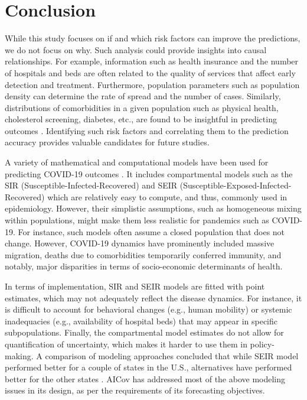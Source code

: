 \documentclass[a4paper, inpress]{jds} %
\renewcommand{\_}{%
    \textunderscore\hspace{0pt}%
}
\begin{document}

\section{Conclusion}

While this study focuses on if and which risk factors can improve the
predictions, we do not focus on why. Such analysis could provide
insights into causal relationships. For example, information such as
health insurance and the number of hospitals and beds are often
related to the quality of services that affect early detection and
treatment. Furthermore, population parameters such as population density can
determine the rate of spread and the number of cases. Similarly,
distributions of comorbidities in a given population such as physical
health, cholesterol screening, diabetes, etc., are found to be
insightful in predicting outcomes \citep{Maleki}. Identifying such risk
factors and correlating them to the prediction accuracy provides
valuable candidates for future studies.

A variety of mathematical and computational models have been used for
predicting COVID-19 outcomes \citep{Jewell}. It includes compartmental
models such as the SIR (Susceptible-Infected-Recovered) and SEIR
(Susceptible-Exposed-Infected-Recovered) which are relatively easy to
compute, and thus, commonly used in epidemiology. However, their
simplistic assumptions, such as homogeneous mixing within populations,
might make them less realistic for pandemics such as COVID-19. For
instance, such models often assume a closed population that does not
change. However, COVID-19 dynamics have prominently included massive
migration, deaths due to comorbidities temporarily conferred immunity,
and notably, major disparities in terms of socio-economic determinants
of health.

In terms of implementation, SIR and SEIR models are fitted with point
estimates, which may not adequately reflect the disease dynamics. For
instance, it is difficult to account for behavioral changes (e.g.,
human mobility) or systemic inadequacies (e.g., availability of
hospital beds) that may appear in specific subpopulations. Finally,
the compartmental model estimates do not allow for quantification of
uncertainty, which makes it harder to use them in policy-making. A
comparison of modeling approaches concluded that while SEIR model
performed better for a couple of states in the U.S., alternatives have
performed better for the other states \citep{Bertozzi}. AICov has
addressed most of the above modeling issues in its design, as per the
requirements of its forecasting objectives.
\end{document}
